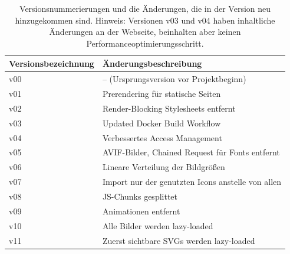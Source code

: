 \documentclass[11pt,a4paper]{article}
\begin{document}
\begin{table}[h]
  \begin{tabular}{|l|l|}
    \hline
    \textbf{Versionsbezeichnung} & \textbf{Änderungsbeschreibung}\\
    \hline
    v00 & -- (Ursprungsversion vor Projektbeginn)\\
    \hline
    v01 & Prerendering für statische Seiten\\
    \hline
    v02 & Render-Blocking Stylesheets entfernt\\
    \hline
    v03 & Updated Docker Build Workflow\\
    \hline
    v04 & Verbessertes Access Management\\
    \hline
    v05 & AVIF-Bilder, Chained Request für Fonts entfernt\\
    \hline
    v06 & Lineare Verteilung der Bildgrößen\\
    \hline
    v07 & Import nur der genutzten Icons anstelle von allen\\
    \hline
    v08 & JS-Chunks gesplittet\\
    \hline
    v09 & Animationen entfernt\\
    \hline
    v10 & Alle Bilder werden lazy-loaded\\
    \hline
    v11 & Zuerst sichtbare SVGs werden lazy-loaded\\
    \hline
  \end{tabular}
  \caption{Versionsnummerierungen und die Änderungen, die in der Version neu hinzugekommen sind. Hinweis: Versionen v03 und v04 haben inhaltliche Änderungen an der Webseite, beinhalten aber keinen Performanceoptimierungsschritt.}\label{tab:versionen}
\end{table}
\end{document}

